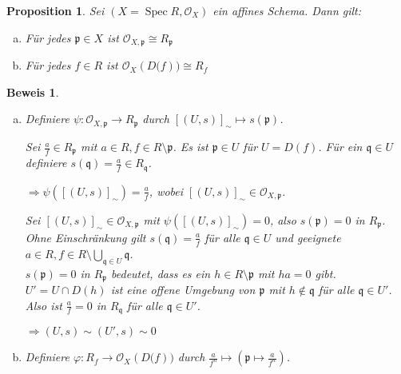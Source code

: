 \documentclass[a4paper,oneside]{scrbook}
\theoremstyle{break}
\newtheorem{Prop}[Def]{Proposition}
\theoremstyle{nonumberbreak}
\theoremstyle{nonumberplain}
\newtheorem{Bew}{Beweis}
\theoremstyle{break}
\renewcommand{\phi}{%
	\ensuremath{\varphi}%
}
\newcommand{\Spec}{%
	\ensuremath{\operatorname{Spec}}%
}
\begin{document}
\begin{Prop}
  \label{prop:2.10}
	Sei $\left(X = \Spec R, \mathcal{O}_X\right)$ ein affines Schema. Dann gilt:
	\begin{enumerate}[(a)]
		\item Für jedes $\mathfrak{p} \in X$ ist $\mathcal{O}_{X,\mathfrak{p}} \cong R_{\mathfrak{p}}$
		\item Für jedes $f \in R$ ist $\mathcal{O}_{X}\left(D(f\right)) \cong R_{f}$
	\end{enumerate}
\end{Prop}
\begin{Bew}
	\begin{enumerate}[(a)]
		\item
			Definiere $\psi\colon \mathcal{O}_{X,\mathfrak{p}} \to R_{\mathfrak{p}}$ durch $[\left(U,s\right)]_{\sim} \mapsto s( \mathfrak{p} )$.

			
				Sei $\frac{a}{f} \in R_{\mathfrak{p}}$ mit $a \in R, f \in R\setminus \mathfrak{p}$.
				Es ist $\mathfrak{p} \in U$ für $U = D\left(f\right)$.
				Für ein $\mathfrak{q} \in U$ definiere $s\left( \mathfrak{q} \right) = \frac{a}{f} \in R_{\mathfrak{q}}$.

				$\Rightarrow \psi\left( [ \left(U,s\right) ]_{\sim} \right) = \frac{a}{f}$, 
				wobei $[ \left(U,s\right) ]_{\sim} \in \mathcal{O}_{X,\mathfrak{p}}$.

				Sei $[\left(U,s\right)]_{\sim} \in \mathcal{O}_{X,\mathfrak{p}}$ mit $\psi( [(U,s)]_{\sim} ) = 0$, also 
				$s \left( \mathfrak{p} \right) = 0$ in $R_{\mathfrak{p}}$.
				Ohne Einschränkung gilt $s\left(\mathfrak{q}\right) = \frac{a}{f}$ für alle $\mathfrak{q} \in U$ und geeignete $a \in R, f \in R \setminus \bigcup_{\mathfrak{q} \in U}\mathfrak{q}$.\\
				$s\left(\mathfrak{p}\right) = 0$ in $R_{\mathfrak{p}}$ bedeutet, dass es ein $h \in R \setminus \mathfrak{p}$ mit
				$ h a = 0$ gibt.
				$U' = U \cap D\left(h\right)$ ist eine offene Umgebung von $\mathfrak{p}$ mit $h \notin \mathfrak{q}$ für alle $\mathfrak{q} \in U'$.
				Also ist $\frac{a}{f} = 0$ in $R_{\mathfrak{q}}$ für alle $\mathfrak{q} \in U'$.

				$\Rightarrow \left(U,s\right) \sim (U',s) \sim 0$
		\item
			Definiere $\phi\colon R_{f} \to \mathcal{O}_{X}\left(D(f\right))$ durch $\frac{a}{f^n} \mapsto ( \mathfrak{p} \mapsto \frac{a}{f^n} )$.


\end{enumerate}
\end{Bew}
\end{document}
